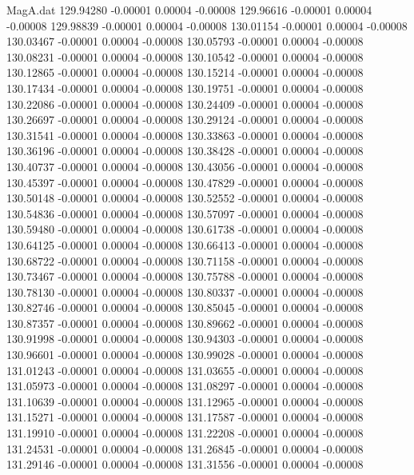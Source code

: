 \begin{filecontents}{MagA.dat}
 129.94280   -0.00001    0.00004   -0.00008
 129.96616   -0.00001    0.00004   -0.00008
 129.98839   -0.00001    0.00004   -0.00008
 130.01154   -0.00001    0.00004   -0.00008
 130.03467   -0.00001    0.00004   -0.00008
 130.05793   -0.00001    0.00004   -0.00008
 130.08231   -0.00001    0.00004   -0.00008
 130.10542   -0.00001    0.00004   -0.00008
 130.12865   -0.00001    0.00004   -0.00008
 130.15214   -0.00001    0.00004   -0.00008
 130.17434   -0.00001    0.00004   -0.00008
 130.19751   -0.00001    0.00004   -0.00008
 130.22086   -0.00001    0.00004   -0.00008
 130.24409   -0.00001    0.00004   -0.00008
 130.26697   -0.00001    0.00004   -0.00008
 130.29124   -0.00001    0.00004   -0.00008
 130.31541   -0.00001    0.00004   -0.00008
 130.33863   -0.00001    0.00004   -0.00008
 130.36196   -0.00001    0.00004   -0.00008
 130.38428   -0.00001    0.00004   -0.00008
 130.40737   -0.00001    0.00004   -0.00008
 130.43056   -0.00001    0.00004   -0.00008
 130.45397   -0.00001    0.00004   -0.00008
 130.47829   -0.00001    0.00004   -0.00008
 130.50148   -0.00001    0.00004   -0.00008
 130.52552   -0.00001    0.00004   -0.00008
 130.54836   -0.00001    0.00004   -0.00008
 130.57097   -0.00001    0.00004   -0.00008
 130.59480   -0.00001    0.00004   -0.00008
 130.61738   -0.00001    0.00004   -0.00008
 130.64125   -0.00001    0.00004   -0.00008
 130.66413   -0.00001    0.00004   -0.00008
 130.68722   -0.00001    0.00004   -0.00008
 130.71158   -0.00001    0.00004   -0.00008
 130.73467   -0.00001    0.00004   -0.00008
 130.75788   -0.00001    0.00004   -0.00008
 130.78130   -0.00001    0.00004   -0.00008
 130.80337   -0.00001    0.00004   -0.00008
 130.82746   -0.00001    0.00004   -0.00008
 130.85045   -0.00001    0.00004   -0.00008
 130.87357   -0.00001    0.00004   -0.00008
 130.89662   -0.00001    0.00004   -0.00008
 130.91998   -0.00001    0.00004   -0.00008
 130.94303   -0.00001    0.00004   -0.00008
 130.96601   -0.00001    0.00004   -0.00008
 130.99028   -0.00001    0.00004   -0.00008
 131.01243   -0.00001    0.00004   -0.00008
 131.03655   -0.00001    0.00004   -0.00008
 131.05973   -0.00001    0.00004   -0.00008
 131.08297   -0.00001    0.00004   -0.00008
 131.10639   -0.00001    0.00004   -0.00008
 131.12965   -0.00001    0.00004   -0.00008
 131.15271   -0.00001    0.00004   -0.00008
 131.17587   -0.00001    0.00004   -0.00008
 131.19910   -0.00001    0.00004   -0.00008
 131.22208   -0.00001    0.00004   -0.00008
 131.24531   -0.00001    0.00004   -0.00008
 131.26845   -0.00001    0.00004   -0.00008
 131.29146   -0.00001    0.00004   -0.00008
 131.31556   -0.00001    0.00004   -0.00008

\end{filecontents}
